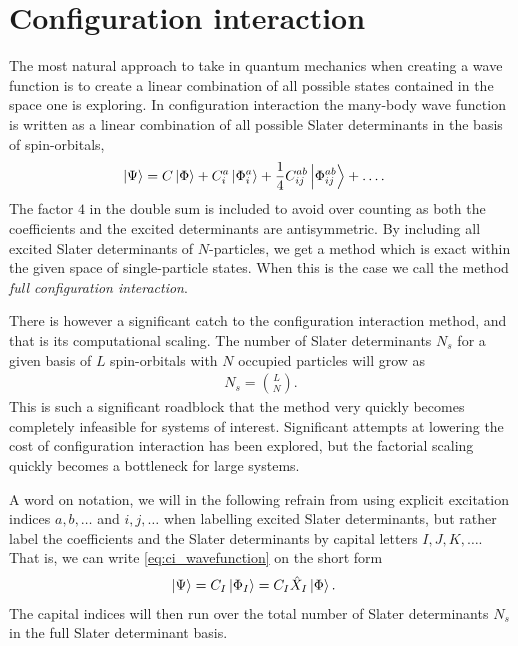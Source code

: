 \chapter{Configuration interaction}
    The most natural approach to take in quantum mechanics when creating a wave
    function is to create a linear combination of all possible states contained
    in the space one is exploring.
    In configuration interaction the many-body wave function is written as a
    linear combination of all possible Slater determinants in the basis of
    spin-orbitals,
    \begin{align}
        \ket{\Psi}
        &= C\ket{\Phi}
        + C^a_i\ket{\Phi^{a}_{i}}
        + \frac{1}{4}C^{ab}_{ij}\ket{\Phi^{ab}_{ij}}
        + \dots.
        \label{eq:ci_wavefunction}
    \end{align}
    The factor $4$ in the double sum is included to avoid over counting as both
    the coefficients and the excited determinants are antisymmetric.
    By including all excited Slater determinants of $N$-particles, we get a
    method which is exact within the given space of single-particle states.
    When this is the case we call the method \emph{full configuration
    interaction}.

    There is however a significant catch to the configuration interaction
    method, and that is its computational scaling.
    The number of Slater determinants $N_{s}$ for a given basis of $L$
    spin-orbitals with $N$ occupied particles will grow as \cite{kvaal2017notes}
    \begin{align}
        N_{s} = \binom{L}{N}.
    \end{align}
    This is such a significant roadblock that the method very quickly becomes
    completely infeasible for systems of interest.
    Significant attempts at lowering the cost of configuration interaction has
    been explored, but the factorial scaling quickly becomes a bottleneck for
    large systems.

    A word on notation, we will in the following refrain from using explicit
    excitation indices $a, b, \dots$ and $i, j, \dots$ when labelling excited
    Slater determinants, but rather label the coefficients and the Slater
    determinants by capital letters $I, J, K, \dots$.
    That is, we can write \autoref{eq:ci_wavefunction} on the short form
    \begin{align}
        \ket{\Psi}
        &= C_{I}\ket{\Phi_I}
        = C_{I}\hat{X}_I\ket{\Phi}.
    \end{align}
    The capital indices will then run over the total number of Slater
    determinants $N_s$ in the full Slater determinant basis.

